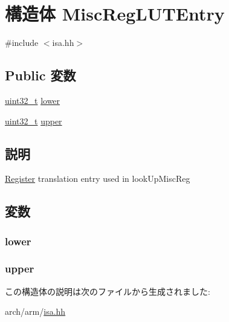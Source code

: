 \hypertarget{structArmISA_1_1ISA_1_1MiscRegLUTEntry}{
\section{構造体 MiscRegLUTEntry}
\label{structArmISA_1_1ISA_1_1MiscRegLUTEntry}
}


{\ttfamily \#include $<$isa.hh$>$}\subsection*{Public 変数}
\begin{DoxyCompactItemize}
\item 
\hyperlink{Type_8hh_a435d1572bf3f880d55459d9805097f62}{uint32\_\-t} \hyperlink{structArmISA_1_1ISA_1_1MiscRegLUTEntry_aff7d2770e8a15d36e4813a75d1c08ff2}{lower}
\item 
\hyperlink{Type_8hh_a435d1572bf3f880d55459d9805097f62}{uint32\_\-t} \hyperlink{structArmISA_1_1ISA_1_1MiscRegLUTEntry_a9e4820bf59a6d1c0791b0de3b8a0cd43}{upper}
\end{DoxyCompactItemize}


\subsection{説明}
\hyperlink{classRegister}{Register} translation entry used in lookUpMiscReg 

\subsection{変数}
\hypertarget{structArmISA_1_1ISA_1_1MiscRegLUTEntry_aff7d2770e8a15d36e4813a75d1c08ff2}{
\subsubsection[{lower}]{ {\bf lower}}}
\label{structArmISA_1_1ISA_1_1MiscRegLUTEntry_aff7d2770e8a15d36e4813a75d1c08ff2}
\hypertarget{structArmISA_1_1ISA_1_1MiscRegLUTEntry_a9e4820bf59a6d1c0791b0de3b8a0cd43}{
\subsubsection[{upper}]{ {\bf upper}}}
\label{structArmISA_1_1ISA_1_1MiscRegLUTEntry_a9e4820bf59a6d1c0791b0de3b8a0cd43}


この構造体の説明は次のファイルから生成されました:\begin{DoxyCompactItemize}
\item 
arch/arm/\hyperlink{arm_2isa_8hh}{isa.hh}\end{DoxyCompactItemize}
